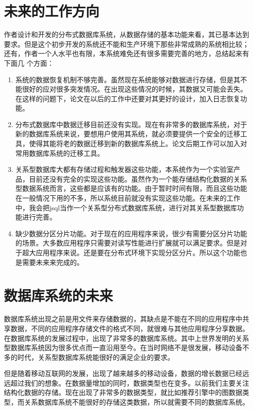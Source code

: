 \section{未来的工作方向}
作者设计和开发的分布式数据库系统，从数据存储的基本功能来看，其已基本达到要求。但是这个初步开发的系统还不能和生产环境下那些非常成熟的系统相比较；
还有，作者一个人水平也有限，本系统难免还有很多需要完善的地方，总结起来有下面几
个方面：

\begin{enumerate}[fullwidth,itemindent=2em]
	\item 系统的数据恢复机制不够完善。虽然现在系统能够对数据进行存储，但是其不能很好的应对很多突发情况。在出现这些情况的时候，其数据又可能会丢失。在这样的问题下，论文在以后的工作中还要对其更好的设计，加入日志恢复功能。
	\item 分布式数据库中数据迁移目前还没有实现。现在有非常多的数据库系统，对于新的数据库系统来说，要想用户使用其系统，就必须要提供一个安全的迁移工具，使得其能将老的数据迁移到新的数据库系统上。论文后期工作可以加入对常用数据库系统的迁移工具。
	\item 关系型数据库大都有存储过程和触发器这些功能，本系统作为一个实验室产品，目前还没有完全的实现这些功能。虽然作为一个能存储结构化数据的关系型数据系统而言，这些都是应该有的功能。由于暂时时间有限，而且这些功能在一般情况下用的不多，所以系统目前就没有实现这些功能。在未来的工作中，我会把jsql当作一个关系型分布式数据库系统，进行对其关系型数据库功能进行完善。
	\item 缺少数据分区分片功能。对于现在的应用程序来说，很少有需要分区分片功能的场景。大多数应用程序只需要对读写性能进行扩展就可以满足要求。但是对于超大应用程序来说。还是要在分布式环境下实现分区分片。所以这个功能也是需要未来来完成的。
\end{enumerate}
\section{数据库系统的未来}
数据库系统出现之前是用文件来存储数据的，其缺点是不能在不同的应用程序中共享数据，不同的应用程序存储文件的格式不同，就很难与其他应用程序分享数据。
在数据库系统的发展过程中，出现了非常多的数据库系统。其中上世界发明的关系型数据库系统因为很多优点而一直沿用至今。在当时网络不是很发展，移动设备不多的时代，关系型数据库系统能很好的满足企业的要求。

但是随着移动互联网的发展，出现了越来越多的移动设备，数据的增长数据已经远远超过我们的想象。在数据量增加的同时，数据类型也在变多。以前我们主要关注结构化数据的存储。现在出现了非常多的数据类型，就比如推荐引擎中的图数据类型，而关系数据库系统不能很好的存储这类数据，所以就需要不同的数据库系统。

